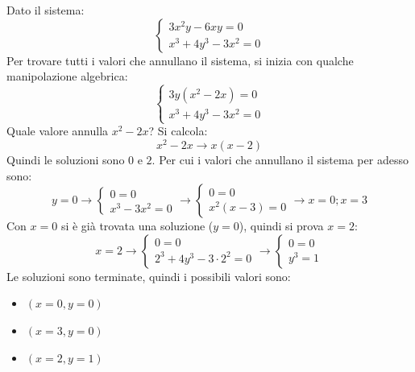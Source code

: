 \documentclass[a4paper]{article}
\begin{document}
	\noindent
	Dato il sistema:
	\begin{equation*}
		\begin{cases}
			3x^{2}y - 6xy = 0 \\
			x^{3} + 4y^{3} - 3x^{2} = 0
		\end{cases}
	\end{equation*}
	Per trovare tutti i valori che annullano il sistema, si inizia con qualche manipolazione algebrica:
	\begin{equation*}
		\begin{cases}
			3y \left(x^{2} - 2x\right) = 0 \\
			x^{3} + 4y^{3} - 3x^{2} = 0
		\end{cases}
	\end{equation*}
	Quale valore annulla $x^{2}-2x$? Si calcola:
	\begin{equation*}
		x^{2}-2x \longrightarrow x\left(x-2\right)
	\end{equation*}
	Quindi le soluzioni sono $0$ e $2$. Per cui i valori che annullano il sistema per adesso sono:
	\begin{equation*}
		y=0 
		\longrightarrow
		\begin{cases}
			0 = 0 \\
			x^{3} - 3x^{2} = 0
		\end{cases}
		\longrightarrow
		\begin{cases}
			0 = 0 \\
			x^{2}\left(x - 3\right) = 0
		\end{cases}
		\longrightarrow
		x = 0; x = 3
	\end{equation*}
	Con $x = 0$ si è già trovata una soluzione ($y=0$), quindi si prova $x=2$:
	\begin{equation*}
		x = 2
		\longrightarrow
		\begin{cases}
			0 = 0 \\
			2^{3} + 4y^{3} - 3 \cdot 2^{2} = 0
		\end{cases}
		\longrightarrow
		\begin{cases}
			0 = 0 \\
			y^{3} = 1
		\end{cases}
	\end{equation*}
	Le soluzioni sono terminate, quindi i possibili valori sono:
	\begin{itemize}
		\item $\left(x=0, y=0\right)$
		\item $\left(x=3, y=0\right)$
		\item $\left(x=2, y=1\right)$
	\end{itemize}\newpage
\end{document}
